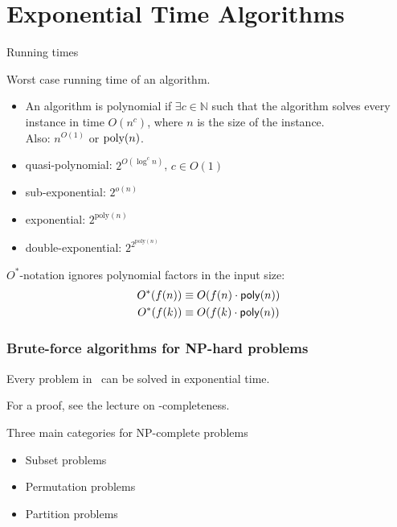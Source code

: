 \section{Exponential Time Algorithms}

\begin{frame}{Running times}

	Worst case running time of an algorithm.
	\begin{itemize}
		\item An algorithm is \alert{polynomial} if $\exists c\in \mathbb{N}$ such that the algorithm solves every instance in time $O(n^c)$, where $n$ is the size of the instance.\\
		      Also: $n^{O(1)}$ or $\text{\normalfont {poly}}(n)$.
		\item \alert{quasi-polynomial}: $2^{O(\log^c n)}$, $c\in O(1)$
		\item \alert{sub-exponential}: $2^{o(n)}$
		\item \alert{exponential}: $2^{\text{poly}(n)}$
		\item \alert{double-exponential}: $2^{2^{\text{poly}(n)}}$
	\end{itemize}

	\medskip
	$O^*$-notation ignores polynomial factors in the input size:
	\begin{align*}
		O^*(f(n)) & \equiv O(f(n) \cdot \mathsf{poly}(n)) \\
		O^*(f(k)) & \equiv O(f(k) \cdot \mathsf{poly}(n))
	\end{align*}

\end{frame}

\begin{frame}
	\frametitle{Brute-force algorithms for NP-hard problems}

	\begin{theorem}
		Every problem in \NP\ can be solved in exponential time.
	\end{theorem}
	\pause{}
	For a proof, see the lecture on \NP-completeness.
\end{frame}

\begin{frame}{Three main categories for NP-complete problems}
	\begin{itemize}
		\item Subset problems
		\item Permutation problems
		\item Partition problems
	\end{itemize}
\end{frame}

